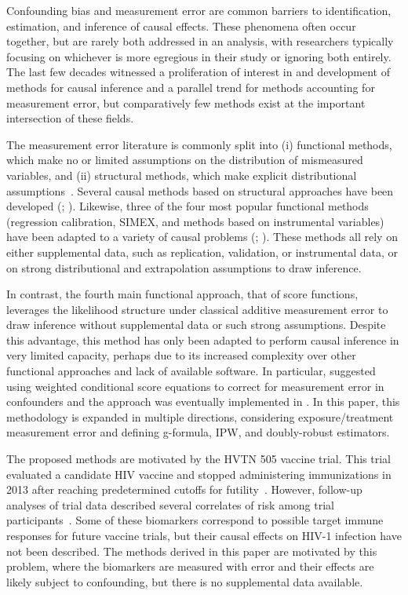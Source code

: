 \documentclass[useAMS,usenatbib,referee]{biom}
\begin{document}
Confounding bias and measurement error are common barriers to identification, estimation, and inference of causal effects. These phenomena often occur together, but are rarely both addressed in an analysis, with researchers typically focusing on whichever is more egregious in their study or ignoring both entirely. The last few decades witnessed a proliferation of interest in and development of methods for causal inference and a parallel trend for methods accounting for measurement error, but comparatively few methods exist at the important intersection of these fields.

The measurement error literature is commonly split into (i) functional methods, which make no or limited assumptions on the distribution of mismeasured variables, and (ii) structural methods, which make explicit distributional assumptions~\citep{carroll2006}. Several causal methods based on structural approaches have been developed (\citealp{kuroki2014,edwards2015multiple,braun2017}; \citealp*{hong2017}). Likewise, three of the four most popular functional methods (regression calibration, SIMEX, and methods based on instrumental variables) have been adapted to a variety of causal problems (\citealp*{vansteelandt2009}; \citealp{cole2010,kendall2015,lockwood2015,kyle2016,wu2019}). These methods all rely on either supplemental data, such as replication, validation, or instrumental data, or on strong distributional and extrapolation assumptions to draw inference.

In contrast, the fourth main functional approach, that of score functions, leverages the likelihood structure under classical additive measurement error to draw inference without supplemental data or such strong assumptions. Despite this advantage, this method has only been adapted to perform causal inference in very limited capacity, perhaps due to its increased complexity over other functional approaches and lack of available software. In particular, \citet*{mccaffrey2013} suggested using weighted conditional score equations to correct for measurement error in confounders and the approach was eventually implemented in \citet{shu2019}. In this paper, this methodology is expanded in multiple directions, considering exposure/treatment measurement error and defining g-formula, IPW, and doubly-robust estimators.

The proposed methods are motivated by the HVTN 505 vaccine trial. This trial evaluated a candidate HIV vaccine and stopped administering immunizations in 2013 after reaching predetermined cutoffs for futility~\citep{hammer2013}. However, follow-up analyses of trial data described several correlates of risk among trial participants~\citep{decamp2017,janes2017,fong2018,neidich2019}. Some of these biomarkers correspond to possible target immune responses for future vaccine trials, but their causal effects on HIV-1 infection have not been described. The methods derived in this paper are motivated by this problem, where the biomarkers are measured with error and their effects are likely subject to confounding, but there is no supplemental data available.
\end{document}
